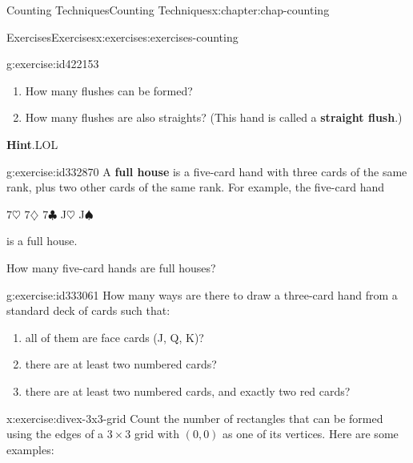 \documentclass[oneside,10pt,]{book}
\newcommand{\blocktitlefont}{\relax}
\newcommand{\terminology}[1]{\textbf{#1}}
\numberwithin{equation}{section}
\begin{document}
\begin{chapterptx}{Counting Techniques}{}{Counting Techniques}{}{}{x:chapter:chap-counting}
\begin{exercises-section}{Exercises}{}{Exercises}{}{}{x:exercises:exercises-counting}
\begin{divisionexercise}{9}{}{}{g:exercise:id422153}
\begin{enumerate}[label=(\alph*)]
\item{}How many flushes can be formed?%
\item{}How many flushes are also straights? (This hand is called a \terminology{straight flush}.)%
\end{enumerate}
%
\par\smallskip%
\noindent\textbf{\blocktitlefont Hint}.\hypertarget{g:hint:id332841}{}\quad{}LOL%
\end{divisionexercise}%
\begin{divisionexercise}{10}{}{}{g:exercise:id332870}%
A \terminology{full house} is a five-card hand with three cards of the same rank, plus two other cards of the same rank. For example, the five-card hand%
\begin{sidebyside}{1}{0.3}{0.3}{0}%
\begin{sbspanel}{0.4}%
7\(\heartsuit\) 7\(\diamondsuit\) 7\(\clubsuit\) J\(\heartsuit\) J\(\spadesuit\)%
\end{sbspanel}%
\end{sidebyside}%
\par
is a full house.%
\par
How many five-card hands are full houses?%
\end{divisionexercise}%
\begin{divisionexercise}{11}{}{}{g:exercise:id333061}%
How many ways are there to draw a three-card hand from a standard deck of cards such that:%
\begin{enumerate}[label=(\alph*)]
\item{}all of them are face cards (J, Q, K)?%
\item{}there are at least two numbered cards?%
\item{}there are at least two numbered cards, and exactly two red cards?%
\end{enumerate}
%
\end{divisionexercise}%
\begin{divisionexercise}{12}{}{}{x:exercise:divex-3x3-grid}%
Count the number of rectangles that can be formed using the edges of a \(3 \times 3\) grid with \((0,0)\) as one of its vertices. Here are some examples:%
\begin{sidebyside}{3}{0.0916666666666667}{0.0916666666666667}{0.183333333333333}%
\begin{sbspanel}{0.15}%
\end{sbspanel}
\end{sidebyside}
\end{divisionexercise}
\end{exercises-section}
\end{chapterptx}
\end{document}
